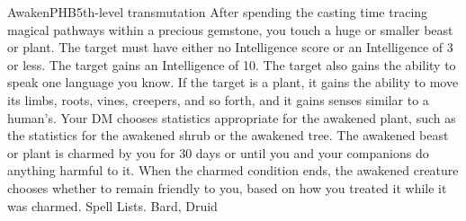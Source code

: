 \begin{spell}{Awaken}{PHB}{5th-level transmutation}
{
}
After spending the casting time tracing magical pathways within a precious gemstone, you touch a huge or smaller beast or plant. The target must have either no Intelligence score or an Intelligence of 3 or less.
The target gains an Intelligence of 10. The target also gains the ability to speak one language you know. If the target is a plant, it gains the ability to move its limbs, roots, vines, creepers, and so forth, and it gains senses similar to a human’s. Your DM chooses statistics appropriate for the awakened plant, such as the statistics for the awakened shrub or the awakened tree.
The awakened beast or plant is charmed by you for 30 days or until you and your companions do anything harmful to it. When the charmed condition ends, the awakened creature chooses whether to remain friendly to you, based on how you treated it while it was charmed.
Spell Lists. Bard, Druid
\end{spell}

